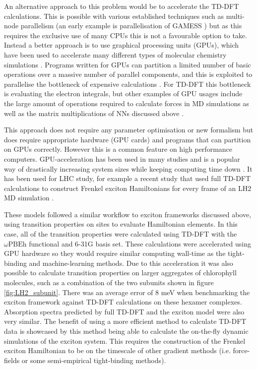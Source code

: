 An alternative approach to this problem would be to accelerate the TD-DFT calculations.
This is possible with various established techniques such as multi-node parallelism
(an early example is parallelisation of GAMESS \cite{Fletcher2000}) but as this 
requires the exclusive use of many CPUs this is not a favourable option to take.
Instead a better approach is to use graphical processing units (GPUs), which have
been used to accelerate many different types of molecular chemistry simulations \cite{Pandey2022}. 
Programs written for GPUs can partition a limited number of basic operations over 
a massive number of parallel components, and this is exploited to parallelise the
bottleneck of expensive calculations \cite{McIntosh-Smith2013}. For TD-DFT this 
bottleneck is evaluating the electron integrals, but other examples of GPU usages 
include the large amount of operations required to calculate forces in MD simulations 
as well as the matrix multiplications of NNs discussed above \cite{Ufimtsev2008, Friedrichs2009, Wu2012}.

This approach does not require any parameter optimisation or new formalism but does
require appropriate hardware (GPU cards) and programs that can partition on GPUs
correctly. However this is a common feature on high performance computers. GPU-acceleration
has been used in many studies and is a popular way of drastically increasing system 
sizes while keeping computing time down \cite{Seritan2021}. It has been used for 
LHC study, for example a recent study that used full TD-DFT calculations to construct
Frenkel exciton Hamiltonians for every frame of an LH2 MD simulation \cite{Sisto2014a, Sisto2017}.

These models followed a similar workflow to exciton frameworks discussed above,
using transition properties on sites to evaluate Hamiltonian elements. In this case, 
all of the transition properties were calculated using TD-DFT with the $\omega\text{PBEh}$
functional and 6-31G basis set. These calculations were accelerated using GPU hardware
so they would require similar computing wall-time as the tight-binding and machine-learning
methods. Due to this acceleration it was also possible to calculate transition properties
on larger aggregates of chlorophyll molecules, such as a combination of the two 
subunits shown in figure \ref{fig:LH2_subunit}. There was an average error of 8 meV
when benchmarking the exciton framework against TD-DFT calculations on these hexamer
complexes\cite{Sisto2014a}. Absorption spectra predicted by full TD-DFT and the
exciton model were also very similar. The benefit of using a more efficient method
to calculate TD-DFT data is showcased by this method being able to calculate the
on-the-fly dynamic simulations of the exciton system. This requires the construction
of the Frenkel exciton Hamiltonian to be on the timescale of other gradient methods
(i.e. force-fields or some semi-empirical tight-binding methods).

